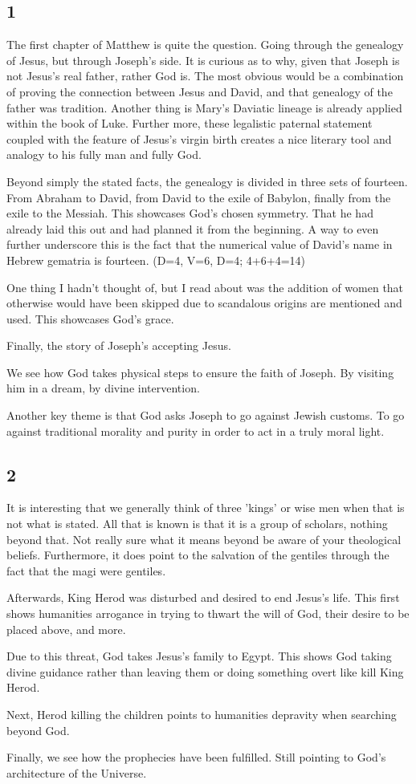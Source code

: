 \subsection{1}
\par The first chapter of Matthew is quite the question. Going through the genealogy of Jesus, but through Joseph's side. It is curious as to why, given that Joseph is not Jesus's real father, rather God is. The most obvious would be a combination of proving the connection between Jesus and David, and that genealogy of the father was tradition. Another thing is Mary's Daviatic lineage is already applied within the book of Luke. Further more, these legalistic paternal statement coupled with the feature of Jesus's virgin birth creates a nice literary tool and analogy to his fully man and fully God.
\par Beyond simply the stated facts, the genealogy is divided in three sets of fourteen. From Abraham to David, from David to the exile of Babylon, finally from the exile to the Messiah. This showcases God's chosen symmetry. That he had already laid this out and had planned it from the beginning. A way to even further underscore this is the fact that the numerical value of David’s name in Hebrew gematria is fourteen. (D=4, V=6, D=4; 4+6+4=14)
\par One thing I hadn't thought of, but I read about was the addition of women that otherwise would have been skipped due to scandalous origins are mentioned and used. This showcases God's grace. 
\par Finally, the story of Joseph's accepting Jesus. 
\par We see how God takes physical steps to ensure the faith of Joseph. By visiting him in a dream, by divine intervention. 
\par Another key theme is that God asks Joseph to go against Jewish customs. To go against traditional morality and purity in order to act in a truly moral light.
\subsection{2}
\par It is interesting that we generally think of three 'kings' or wise men when that is not what is stated. All that is known is that it is a group of scholars, nothing beyond that. Not really sure what it means beyond be aware of your theological beliefs. Furthermore, it does point to the salvation of the gentiles through the fact that the magi were gentiles.
\par Afterwards, King Herod was disturbed and desired to end Jesus's life. This first shows humanities arrogance in trying to thwart the will of God, their desire to be placed above, and more. 
\par Due to this threat, God takes Jesus's family to Egypt. This shows God taking divine guidance rather than leaving them or doing something overt like kill King Herod.
\par Next, Herod killing the children points to humanities depravity when searching beyond God.
\par Finally, we see how the prophecies have been fulfilled. Still pointing to God's architecture of the Universe.
